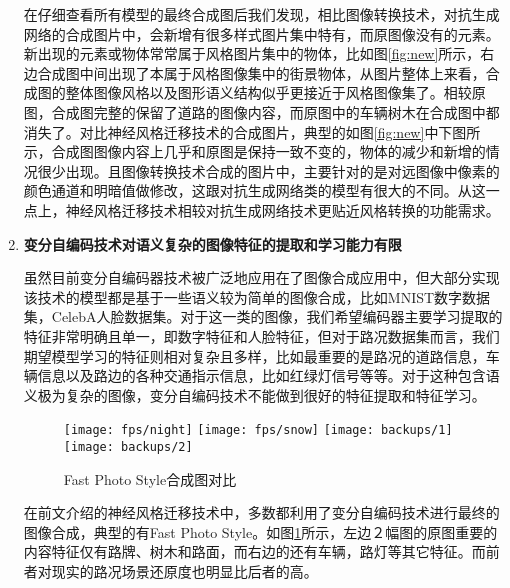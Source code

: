 \begin{enumerate}[itemindent=20pt, listparindent = 0.7cm]
    在仔细查看所有模型的最终合成图后我们发现，相比图像转换技术，对抗生成网络的合成图片中，会新增有很多样式图片集中特有，而原图像没有的元素。新出现的元素或物体常常属于风格图片集中的物体，比如图\ref{fig:new}所示，右边合成图中间出现了本属于风格图像集中的街景物体，从图片整体上来看，合成图的整体图像风格以及图形语义结构似乎更接近于风格图像集了。相较原图，合成图完整的保留了道路的图像内容，而原图中的车辆树木在合成图中都消失了。对比神经风格迁移技术的合成图片，典型的如图\ref{fig:new}中下图所示，合成图图像内容上几乎和原图是保持一致不变的，物体的减少和新增的情况很少出现。且图像转换技术合成的图片中，主要针对的是对远图像中像素的颜色通道和明暗值做修改，这跟对抗生成网络类的模型有很大的不同。从这一点上，神经风格迁移技术相较对抗生成网络技术更贴近风格转换的功能需求。

    \item \textbf{变分自编码技术对语义复杂的图像特征的提取和学习能力有限}

    虽然目前变分自编码器技术被广泛地应用在了图像合成应用中，但大部分实现该技术的模型都是基于一些语义较为简单的图像合成，比如MNIST数字数据集，CelebA人脸数据集。对于这一类的图像，我们希望编码器主要学习提取的特征非常明确且单一，即数字特征和人脸特征，但对于路况数据集而言，我们期望模型学习的特征则相对复杂且多样，比如最重要的是路况的道路信息，车辆信息以及路边的各种交通指示信息，比如红绿灯信号等等。对于这种包含语义极为复杂的图像，变分自编码技术不能做到很好的特征提取和特征学习\cite{vae}。
    
    \begin{figure}[h]
        \centering
        \texttt{[image: fps/night]}
        \texttt{[image: fps/snow]}
        \texttt{[image: backups/1]}
        \texttt{[image: backups/2]}
        \caption{Fast Photo Style合成图对比}
        \label{fps:com}
    \end{figure}

    在前文介绍的神经风格迁移技术中，多数都利用了变分自编码技术进行最终的图像合成，典型的有Fast Photo Style。如图\ref{fps:com}所示，左边２幅图的原图重要的内容特征仅有路牌、树木和路面，而右边的还有车辆，路灯等其它特征。而前者对现实的路况场景还原度也明显比后者的高。

\end{enumerate}